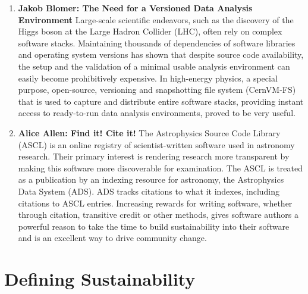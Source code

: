 \documentclass[11pt, oneside]{amsart}
\newcommand{\todo}[1]{{\color{blue}$\blacksquare$~\textsf{[TODO: #1]}}}
\begin{document}
\begin{enumerate}
\item \textbf{Jakob Blomer: The Need for a Versioned Data Analysis Environment}
%
Large-scale scientific endeavors, such as the discovery of the Higgs
boson at the Large Hadron Collider (LHC), often rely on complex software
stacks.  Maintaining thousands of dependencies of software
libraries and operating system versions has shown that despite
source code availability, the setup and the validation of a minimal
usable analysis environment can easily become prohibitively expensive.
 In high-energy physics, a
special purpose, open-source, versioning and snapshotting file system
(CernVM-FS) that is used to capture and distribute entire software stacks,
providing instant access to ready-to-run data analysis environments,
proved to be very useful.
 

\item \textbf{Alice Allen: Find it! Cite it!}
%
The Astrophysics Source Code Library (ASCL) is an online registry of
scientist-written software used in astronomy research. Their primary interest is
rendering research more transparent by making this software more discoverable for
examination. The ASCL is treated as a publication by an indexing resource for
astronomy, the Astrophysics Data System (ADS). ADS tracks citations to what it
indexes, including citations to ASCL entries. Increasing rewards for writing
software, whether through citation, transitive credit or other methods, gives
software authors a powerful reason to take the time to build sustainability into
their software and is an excellent way to drive community change. 

\begin{comment}
The ASCL actively looks for opportunities to use change management strategies to
move astronomy to a more transparent discipline; these strategies can be used in
other disciplines to further change in them.
\end{comment}
\end{enumerate}
 
 

\section{Defining Sustainability} \label{sec:defining}
\end{document}

